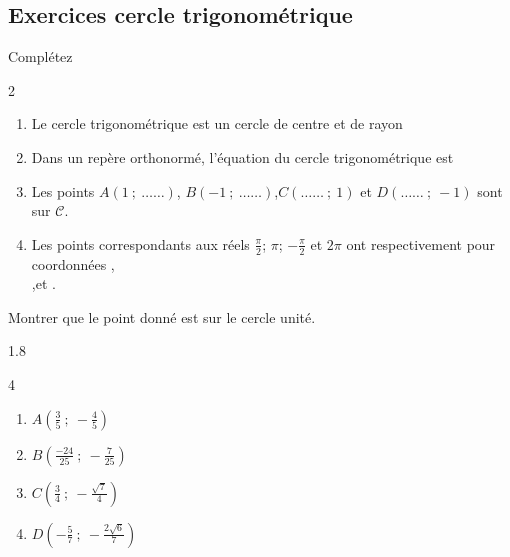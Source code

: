 \documentclass[main.tex]{subfiles}
\begin{document}
%	 
\newpage 
{}  
\pagestyle{scrheadings} %
\onehalfspacing 
\subsection{Exercices cercle trigonométrique}

\begin{exercise}[concepts] Complétez
\begin{spacing}{2}
\begin{enumerate}[label={},leftmargin=*]
\item Le cercle trigonométrique est un cercle de centre \dotfill et de rayon \dotfill
\item Dans un repère orthonormé, l'équation du cercle trigonométrique est \dotfill 
\item Les points $A(1~;~\ldots\ldots)$, $B(-1~;~\ldots\ldots)$,$C(\ldots\ldots~;~1)$ et $D(\ldots\ldots~;~-1)$ sont sur $\mathscr{C}$. 
\item Les points correspondants aux réels $\tfrac{\pi}{2}$; $\pi$; $-\tfrac{\pi}{2}$ et $2\pi$ ont respectivement pour coordonnées \dotfill, \\
\null \dotfill,\dotfill et \dotfill.
\end{enumerate}
\end{spacing} \vspace{-1em}
\end{exercise}  
\begin{exercise} Montrer que le point donné est sur le cercle unité.
\vspace{-0.5em}
\begin{spacing}{1.8}
\begin{multicols}{4} 
\begin{enumerate}[label={\arabic*)},leftmargin=*]
\item $A\left(\tfrac{3}{5}~;~-\tfrac{4}{5}\right)$
\item $B\left(\tfrac{-24}{25}~;~-\tfrac{7}{25}\right)$
\item $C\left(\tfrac{3}{4}~;~-\tfrac{\sqrt{7}}{4}\right)$
\item $D\left(-\tfrac{5}{7}~;~-\tfrac{2\sqrt{6}}{7}\right)$
\end{enumerate}
\end{multicols}\vspace{-2em}
\end{spacing}
\end{exercise}
\end{document}
